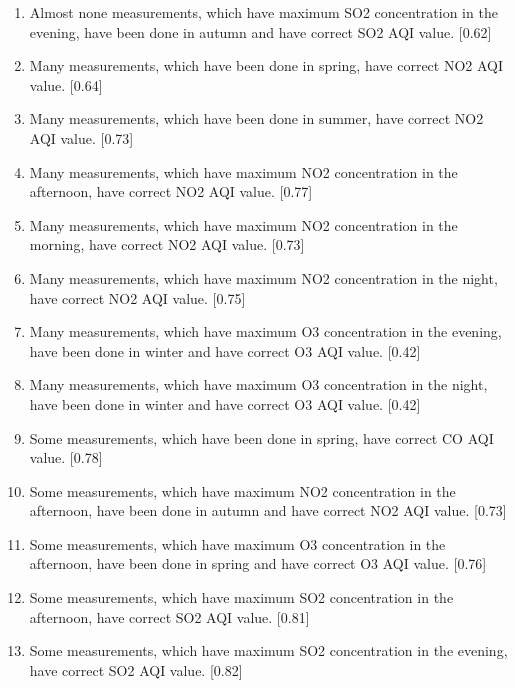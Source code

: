 \documentclass{classrep}
\begin{document}
{{\begin{enumerate}
                \item Almost none measurements, which have maximum SO2 concentration in the evening, have been done in autumn and have correct SO2 AQI value. [0.62]
                \item Many measurements, which have been done in spring, have correct NO2 AQI value. [0.64]
                \item Many measurements, which have been done in summer, have correct NO2 AQI value. [0.73]
                \item Many measurements, which have maximum NO2 concentration in the afternoon, have correct NO2 AQI value. [0.77]
                \item Many measurements, which have maximum NO2 concentration in the morning, have correct NO2 AQI value. [0.73]
                \item Many measurements, which have maximum NO2 concentration in the night, have correct NO2 AQI value. [0.75]
                \item Many measurements, which have maximum O3 concentration in the evening, have been done in winter and have correct O3 AQI value. [0.42]
                \item Many measurements, which have maximum O3 concentration in the night, have been done in winter and have correct O3 AQI value. [0.42]
                \item Some measurements, which have been done in spring, have correct CO AQI value. [0.78]
                \item Some measurements, which have maximum NO2 concentration in the afternoon, have been done in autumn and have correct NO2 AQI value. [0.73]
                \item Some measurements, which have maximum O3 concentration in the afternoon, have been done in spring and have correct O3 AQI value. [0.76]
                \item Some measurements, which have maximum SO2 concentration in the afternoon, have correct SO2 AQI value. [0.81]
                \item Some measurements, which have maximum SO2 concentration in the evening, have correct SO2 AQI value. [0.82]
            \end{enumerate}
        }

}
\end{document}
